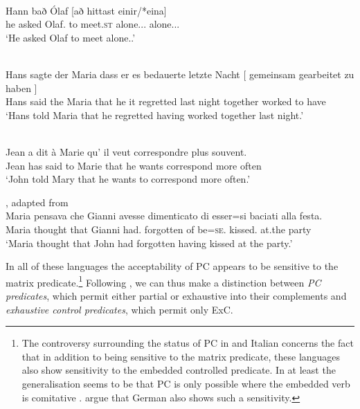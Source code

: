 \documentclass[output=paper]{langsci/langscibook}
\begin{document}
\ea\label{ex:key:24.4}  \parencite[149]{Sheehan2018b}\\
	\gll Hann bað    Ólaf     [að   hittast     einir/*eina]\\
he      asked Olaf.\Acc{}    to  meet.\textsc{st}   alone.\Nom.\M.\Pl{} alone.\Acc.\M.\Pl{}\\
	\glt ‘He asked Olaf to meet alone.\Pl{}.’
\z

\ea\label{ex:key:24.5}  \parencite[45]{Landau2000}\\
	\gll Hans sagte der Maria dass er  es   bedauerte   letzte Nacht [ gemeinsam   gearbeitet   zu haben ]\\
    Hans said   the Maria that    he it   regretted   last night {} together     worked   to have\\
	\glt ‘Hans told Maria that he regretted having worked together last night.’
\z

\ea\label{ex:key:24.6}  \parencite[85]{Landau2000}\\
	\gll Jean a    dit      à Marie  qu’   il  veut    correspondre plus  souvent.\\
		Jean has said   to Marie that he wants correspond    more often\\
	\glt ‘John told Mary that he wants to correspond more often.’
\z

\ea\label{ex:key:24.7} , adapted from \parencite[46]{Landau2000}\\
	\gll Maria pensava che Gianni avesse dimenticato di esser=si baciati alla festa.\\
		Maria thought that Gianni had.\Sbjv{} forgotten of be=\textsc{se}.\Third{} kissed.\Pl{} at.the party\\
	\glt ‘Maria thought that John had forgotten having kissed at the party.’
\z

In all of these languages the acceptability of \gls{PC} appears to be sensitive to the matrix  predicate.\footnote{The
controversy surrounding the status of \gls{PC} in
 and Italian concerns the fact that in addition to being sensitive to the
matrix  predicate, these languages also show sensitivity to the embedded
controlled predicate. In  at least the generalisation seems to be that
\gls{PC} is only possible where the embedded verb
is comitative \citep{Sheehan2014c,AuthierReed2018,PitteroffSheehan2018}.
\textcite{PitteroffEtAl2017a,PitteroffEtAl2017b} argue that German also shows
such a sensitivity.}  Following \textcite{Landau2000,Landau2004}, we
can thus make a distinction between \emph{PC predicates}, which permit either
partial or exhaustive  into their complements and \emph{exhaustive
control predicates}, which permit only \gls{ExC}.
\end{document}
